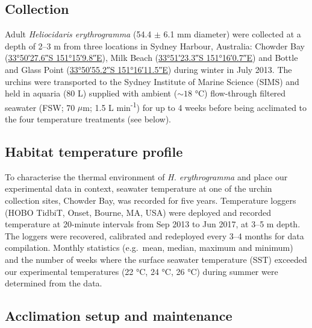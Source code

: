 \documentclass[a4paper,10pt, oneside]{memoir}
\begin{document}
\hypertarget{collection}{%
\subsection{Collection}\label{collection}}

Adult \emph{Heliocidaris erythrogramma} (54.4 \(\pm\) 6.1 mm diameter) were collected at a depth of 2--3 m from three locations in Sydney Harbour, Australia: Chowder Bay (\href{https://www.google.com/maps/?q=-33.840986,151.252714}{\ang{33;50;27.6}S \ang{151;15;9.8}E}), Milk Beach (\href{https://www.google.com/maps/?q=-33.856467,151.266856}{\ang{33;51;23.3}S \ang{151;16;0.7}E}) and Bottle and Glass Point (\href{https://www.google.com/maps/?q=-33.848678,151.269870}{\ang{33;50;55.2}S \ang{151;16;11.5}E}) during winter in July 2013.
The urchins were transported to the Sydney Institute of Marine Science (SIMS) and held in aquaria (80 L) supplied with ambient (\(\sim 18\) °C) flow-through filtered seawater (FSW; 70 \(\mu\)m; 1.5 L min\textsuperscript{-1}) for up to 4 weeks before being acclimated to the four temperature treatments (see below).

\hypertarget{habitat-temperature-profile}{%
\subsection{Habitat temperature profile}\label{habitat-temperature-profile}}

To characterise the thermal environment of \emph{H. erythrogramma} and place our experimental data in context, seawater temperature at one of the urchin collection sites, Chowder Bay, was recorded for five years.
Temperature loggers (HOBO TidbiT, Onset, Bourne, MA, USA) were deployed and recorded temperature at 20-minute intervals from Sep 2013 to Jun 2017, at 3--5 m depth.
The loggers were recovered, calibrated and redeployed every 3--4 months for data compilation. Monthly statistics (e.g.~mean, median, maximum and minimum) and the number of weeks where the surface seawater temperature (SST) exceeded our experimental temperatures (22 °C, 24 °C, 26 °C) during summer were determined from the data.

\hypertarget{acclimation-setup-and-maintenance}{%
\subsection{Acclimation setup and maintenance}\label{acclimation-setup-and-maintenance}}
\end{document}
